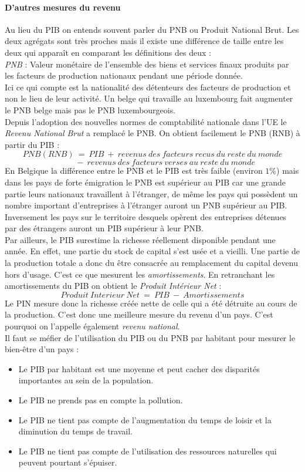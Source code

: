 \documentclass[10pt]{book}
\begin{document}
\paragraph{D'autres mesures du revenu}
Au lieu du PIB on entends souvent parler du PNB ou Produit National Brut. Les deux agrégats sont très proches mais il existe une différence de taille entre les deux qui apparaît en comparant les définitions des deux : \\
\textit{PNB} : Valeur monétaire de l'ensemble des biens et services finaux produits par les facteurs de production nationaux pendant une période donnée. \\
Ici ce qui compte est la nationalité des détenteurs des facteurs de production et non le lieu de leur activité. Un belge qui travaille au luxembourg fait augmenter le PNB belge mais pas le PNB luxembourgeois. \\
Depuis l'adoption des nouvelles normes de comptabilité nationale dans l'UE le \textit{Revenu National Brut} a remplacé le PNB. On obtient facilement le PNB (RNB) à partir du PIB :
$$PNB(RNB)~=~PIB~+~revenus~des~facteurs~recus~du~reste~du~monde$$
$$~~~~~~~~~~~~~~-~revenus~des~facteurs~verses~au~reste~du~monde$$
En Belgique la différence entre le PNB et le PIB est très faible (environ $1\%$) mais dans les pays de forte émigration le PNB est supérieur au PIB car une grande partie leurs nationaux travaillent à l'étranger, de même les pays qui possèdent un nombre important d'entreprises à l'étranger auront un PNB supérieur au PIB. Inversement les pays sur le territoire desquels opèrent des entreprises détenues par des étrangers auront un PIB supérieur à leur PNB. \\
Par ailleurs, le PIB surestime la richesse réellement disponible pendant une année. En effet, une partie du stock de capital s'est usée et a vieilli. Une partie de la production totale a donc du être consacrée au remplacement du capital devenu hors d'usage. C'est ce que mesurent les \textit{amortissements}. En retranchant les amortissements du PIB on obtient le \textit{Produit Intérieur Net} :
$$Produit~Interieur~Net~=~PIB~-~Amortissements$$
Le PIN mesure donc la richesse créée nette de celle qui a été détruite au cours de la production. C'est donc une meilleure mesure du revenu d'un pays. C'est pourquoi on l'appelle également \textit{revenu national}. \\
Il faut se méfier de l'utilisation du PIB ou du PNB par habitant pour mesurer le bien-être d'un pays : 
\begin{itemize}
  \item Le PIB par habitant est une moyenne et peut cacher des disparités importantes au sein de la population.
  \item Le PIB ne prends pas en compte la pollution.
  \item Le PIB ne tient pas compte de l'augmentation du temps de loisir et la diminution du temps de travail.
  \item Le PIB ne tient pas compte de l'utilisation des ressources naturelles qui peuvent pourtant s'épuiser.
\end{itemize}
\end{document}
